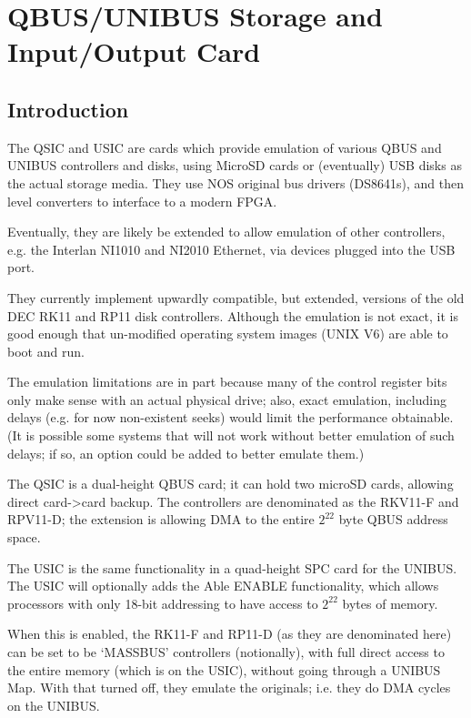 %

\chapter{QBUS/UNIBUS Storage and Input/Output Card}
\section{Introduction}

The QSIC and USIC are cards which provide emulation of various QBUS and
UNIBUS controllers and disks, using MicroSD cards or (eventually) USB disks
as the actual storage media. They use NOS original bus drivers (DS8641s),
and then level converters to interface to a modern FPGA.

Eventually, they are likely be extended to allow emulation of other
controllers, e.g. the Interlan NI1010 and NI2010 Ethernet, via devices
plugged into the USB port.

They currently implement upwardly compatible, but extended, versions of the
old DEC RK11 and RP11 disk controllers. Although the emulation is not exact,
it is good enough that un-modified operating system images (UNIX V6) are able
to boot and run.

The emulation limitations are in part because many of the control register
bits only make sense with an actual physical drive; also, exact emulation,
including delays (e.g. for now non-existent seeks) would limit the
performance obtainable. (It is possible some systems that will not work
without better emulation of such delays; if so, an option could be added to
better emulate them.)

The QSIC is a dual-height QBUS card; it can hold two microSD cards,
allowing direct card-\textgreater card backup. The controllers are
denominated as the RKV11-F and RPV11-D; the extension is allowing DMA
to the entire $2^{22}$ byte QBUS address space.

The USIC is the same functionality in a quad-height SPC card for the UNIBUS.
The USIC will optionally adds the Able ENABLE functionality, which allows
processors with only 18-bit addressing to have access to $2^{22}$ bytes of
memory.

When this is enabled, the RK11-F and RP11-D (as they are denominated here)
can be set to be `MASSBUS' controllers (notionally), with full direct access
to the entire memory (which is on the USIC), without going through a UNIBUS
Map. With that turned off, they emulate the originals; i.e. they do DMA
cycles on the UNIBUS.

